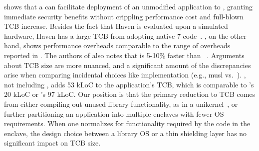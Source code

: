 \graphenesgx{} shows that 
a \libos{} can facilitate deployment of an unmodified application to \sgx{},
granting immediate security benefits
without crippling performance cost and full-blown TCB increase.
Besides the fact that
Haven is evaluated upon a simulated hardware,
Haven has a large TCB from adopting native \win{} 7 code~\cite{porter11drawbridge}.
\graphenesgx{}, on the other hand,
shows performance overheads comparable to the range of overheads reported in \scone{}.
The authors of \panoply{} also notes that \graphenesgx{}
is 5-10\% faster than \panoply{}~\cite{shinde17panoply}.
Arguments about TCB size are more nuanced, and a significant amount of the discrepancies
arise when comparing incidental choices like \libc{} implementation (e.g., musl vs.\ \glibc{}).
\graphene{}, not including \glibc{}, adds 53 kLoC to the application's TCB, which is comparable to
\panoply{}'s 20 kLoC or \scone{}'s 97 kLoC. %
Our position is that the primary reduction to TCB comes from either compiling out
unused library functionality, as in a unikernel~\cite{unikernels}, %
or further partitioning an application into multiple enclaves with fewer
OS requirements.
When one normalizes for functionality required by the code in the enclave, the design choice between a library OS or a thin shielding layer has no significant impact on TCB size.




